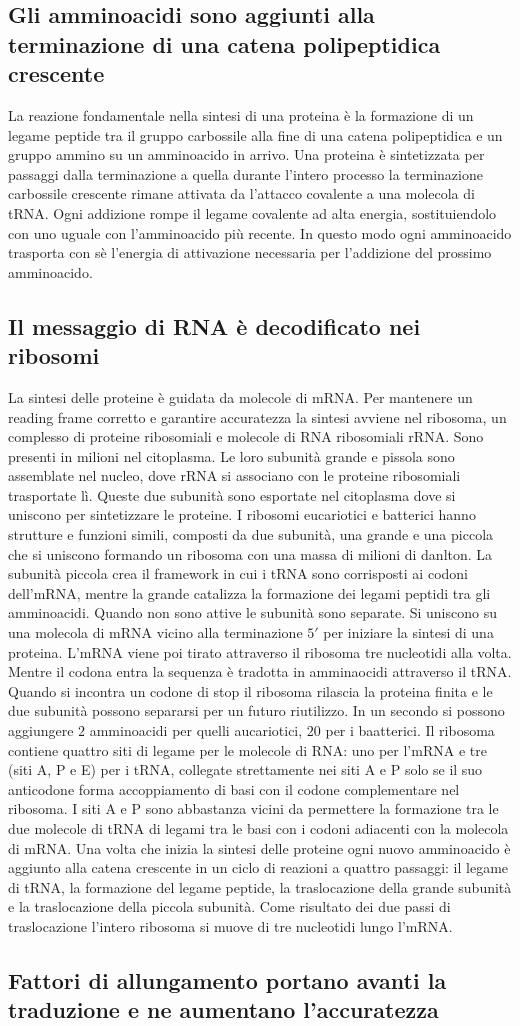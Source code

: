 \subsection{Gli amminoacidi sono aggiunti alla terminazione  di una catena polipeptidica crescente}
La reazione fondamentale nella sintesi di una proteina \`e la formazione di un legame peptide tra il gruppo carbossile alla fine di una catena polipeptidica e un gruppo ammino su un 
amminoacido in arrivo. Una proteina \`e sintetizzata per passaggi dalla terminazione  a quella  durante l'intero processo la terminazione carbossile crescente rimane
attivata da l'attacco covalente a una molecola di tRNA. Ogni addizione rompe il legame covalente ad alta energia, sostituiendolo con uno uguale con l'amminoacido pi\`u recente. In
questo modo ogni amminoacido trasporta con s\`e l'energia di attivazione necessaria per l'addizione del prossimo amminoacido. 
\subsection{Il messaggio di RNA \`e decodificato nei ribosomi}
La sintesi delle proteine \`e guidata da molecole di mRNA. Per mantenere un reading frame corretto e garantire accuratezza la sintesi avviene nel ribosoma, un complesso di proteine
ribosomiali e molecole di RNA ribosomiali rRNA. Sono presenti in milioni nel citoplasma. Le loro subunit\`a grande e pissola sono assemblate nel nucleo, dove rRNA si associano con le 
proteine ribosomiali trasportate l\`i. Queste due subunit\`a sono esportate nel citoplasma dove si uniscono per sintetizzare le proteine. I ribosomi eucariotici e batterici hanno
strutture e funzioni simili, composti da due subunit\`a, una grande e una piccola che si uniscono formando un ribosoma con una massa di milioni di danlton. La subunit\`a piccola 
crea il framework in cui i tRNA sono corrisposti ai codoni dell'mRNA, mentre la grande catalizza la formazione dei legami peptidi tra gli amminoacidi. Quando non sono attive le 
subunit\`a sono separate. Si uniscono su una molecola di mRNA vicino alla terminazione $5'$ per iniziare la sintesi di una proteina. L'mRNA viene poi tirato attraverso il ribosoma tre
nucleotidi alla volta. Mentre il codona entra la sequenza \`e tradotta in amminaocidi attraverso il tRNA. Quando si incontra un codone di stop il ribosoma rilascia la proteina finita e 
le due subunit\`a possono separarsi per un futuro riutilizzo. In un secondo si possono aggiungere $2$ amminoacidi per quelli aucariotici, $20$ per i baatterici. Il ribosoma contiene
quattro siti di legame per le molecole di RNA: uno per l'mRNA e tre (siti A, P e E) per i tRNA, collegate strettamente nei siti A e P solo se il suo anticodone forma accoppiamento di 
basi con il codone complementare nel ribosoma. I siti A e P sono abbastanza vicini da permettere la formazione tra le due molecole di tRNA di legami tra le basi con i codoni adiacenti
con la molecola di mRNA. Una volta che inizia la sintesi delle proteine ogni nuovo amminoacido \`e aggiunto alla catena crescente in un ciclo di reazioni a quattro passaggi: il legame
di tRNA, la formazione del legame peptide, la traslocazione della grande subunit\`a e la traslocazione della piccola subunit\`a. Come risultato dei due passi di traslocazione l'intero
ribosoma si muove di tre nucleotidi lungo l'mRNA.
\subsection{Fattori di allungamento portano avanti la traduzione e ne aumentano l'accuratezza}
